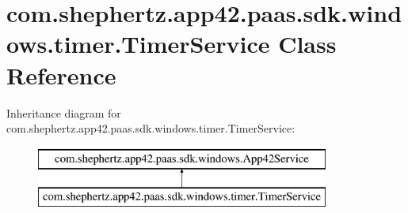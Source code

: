 \hypertarget{classcom_1_1shephertz_1_1app42_1_1paas_1_1sdk_1_1windows_1_1timer_1_1_timer_service}{\section{com.\+shephertz.\+app42.\+paas.\+sdk.\+windows.\+timer.\+Timer\+Service Class Reference}
\label{classcom_1_1shephertz_1_1app42_1_1paas_1_1sdk_1_1windows_1_1timer_1_1_timer_service}
}
Inheritance diagram for com.\+shephertz.\+app42.\+paas.\+sdk.\+windows.\+timer.\+Timer\+Service\+:\begin{figure}[H]
\begin{center}
\leavevmode
\includegraphics[height=2.000000cm]{classcom_1_1shephertz_1_1app42_1_1paas_1_1sdk_1_1windows_1_1timer_1_1_timer_service}
\end{center}
\end{figure}
